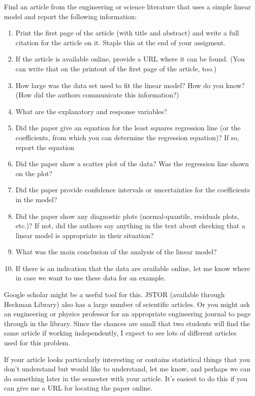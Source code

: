 \documentclass[twoside]{book}\usepackage[]{graphicx}\usepackage[]{xcolor}
\newcounter{example}[section]
\begin{document}
\begin{problem}
	Find an article from the engineering or science literature that uses 
	a simple linear model and report the following information:
	\begin{enumerate}
		\item
			Print the first page of the article (with title and abstract) and write
			a full citation for the article on it.  Staple this at the end of your
			assigment.
		\item
			If the article is available online, provide a URL where it can be found.
			(You can write that on the printout of the first page of the article, too.)
		\item
			How large was the data set used to fit the linear model?  How do you know?  (How 
			did the authors communicate this information?)
		\item
			What are the explanatory and response variables?
		\item
			Did the paper give an equation for the least squares regression line 
			(or the coefficients, from which you can determine the regression equation)?
			If so, report the equation
		\item
			Did the paper show a scatter plot of the data?  Was the regression line 
			shown on the plot?
		\item
			Did the paper provide confidence intervals or uncertainties for the 
			coefficients in the model?
		\item
			Did the paper show any diagnostic plots (normal-quantile, residuals plots, etc.)?
			If not, did the authors say anything in the text about checking that 
			a linear model is appropriate in their situation?
		\item
			What was the main conclusion of the analysis of the linear model?
		\item
				If there is an indication that the data are available online,
				let me know where in case we want to use these data for an example.
	\end{enumerate}
	Google scholar might be a useful tool for this.  JSTOR (available through Heckman
	Library) also has a large number of scientific articles.  Or you might ask an
	engineering or physics professor for an appropriate engineering journal to
	page through in the library.  Since the chances are small that two students
	will find the same article if working independently, I expect to see lots
	of different articles used for this problem.

	If your article looks particularly interesting or contains statistical 
	things that you don't understand but would like to understand, let me know,
	and perhaps we can do something later in the semester with your article.
	It's easiest to do this if you can give me a URL for locating the paper online.
\end{problem}
\end{document}
